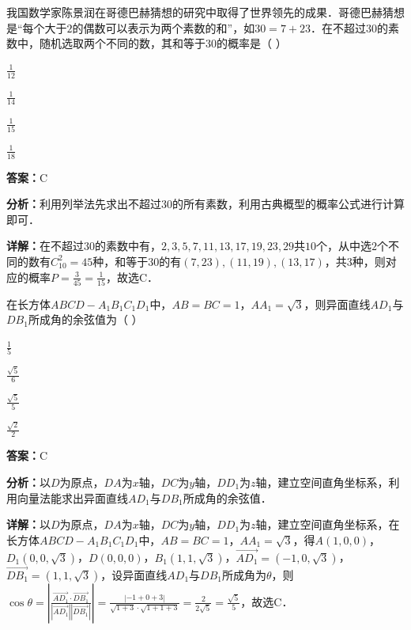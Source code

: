 \begin{question}[points=5]
我国数学家陈景润在哥德巴赫猜想的研究中取得了世界领先的成果．哥德巴赫猜想是“每个大于$2$的偶数可以表示为两个素数的和”，如$30=7+23$．在不超过$30$的素数中，随机选取两个不同的数，其和等于$30$的概率是（                   ）
\begin{choices}
  \item $\frac{1}{12}$
  \item $\frac{1}{14}$
  \item $\frac{1}{15}$
  \item $\frac{1}{18}$
\end{choices}
\begin{solution}
\textbf{答案：}C

\textbf{分析：}利用列举法先求出不超过$30$的所有素数，利用古典概型的概率公式进行计算即可．

\textbf{详解：}在不超过$30$的素数中有，$2,3,5,7,11,13,17,19,23,29$共$10$个，从中选$2$个不同的数有$C_{10}^2=45$种，和等于$30$的有$(7,23),(11,19),(13,17)$，共$3$种，则对应的概率$P=\frac{3}{45}=\frac{1}{15}$，故选C．
\end{solution}
\end{question}

\begin{question}[points=5]
在长方体$ABCD-A_1B_1C_1D_1$中，$AB=BC=1$，$AA_1=\sqrt{3}$，则异面直线$AD_1$与$DB_1$所成角的余弦值为（        ）
\begin{choices}
  \item $\frac{1}{5}$
  \item $\frac{\sqrt{5}}{6}$
  \item $\frac{\sqrt{5}}{5}$
  \item $\frac{\sqrt{2}}{2}$
\end{choices}
\begin{solution}
\textbf{答案：}C

\textbf{分析：}以$D$为原点，$DA$为$x$轴，$DC$为$y$轴，$DD_1$为$z$轴，建立空间直角坐标系，利用向量法能求出异面直线$AD_1$与$DB_1$所成角的余弦值．

\textbf{详解：}以$D$为原点，$DA$为$x$轴，$DC$为$y$轴，$DD_1$为$z$轴，建立空间直角坐标系，在长方体$ABCD-A_1B_1C_1D_1$中，$AB=BC=1$，$AA_1=\sqrt{3}$，得$A(1,0,0)$，$D_1(0,0,\sqrt{3})$，$D(0,0,0)$，$B_1(1,1,\sqrt{3})$，$\overrightarrow{AD_1}=(-1,0,\sqrt{3})$，$\overrightarrow{DB_1}=(1,1,\sqrt{3})$，设异面直线$AD_1$与$DB_1$所成角为$\theta$，则$\cos\theta=\left|\frac{\overrightarrow{AD_1}\cdot\overrightarrow{DB_1}}{|\overrightarrow{AD_1}||\overrightarrow{DB_1}|}\right|=\frac{|-1+0+3|}{\sqrt{1+3}\cdot\sqrt{1+1+3}}=\frac{2}{2\sqrt{5}}=\frac{\sqrt{5}}{5}$，故选C．
\end{solution}
\end{question}

